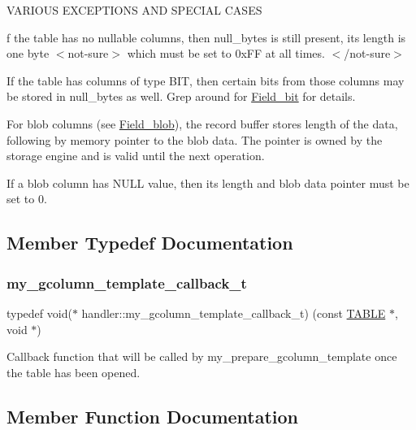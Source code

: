 V\+A\+R\+I\+O\+US E\+X\+C\+E\+P\+T\+I\+O\+NS A\+ND S\+P\+E\+C\+I\+AL C\+A\+S\+ES

f the table has no nullable columns, then null\+\_\+bytes is still present, its length is one byte $<$not-\/sure$>$ which must be set to 0x\+FF at all times. $<$/not-\/sure$>$

If the table has columns of type B\+IT, then certain bits from those columns may be stored in null\+\_\+bytes as well. Grep around for \mbox{\hyperlink{classField__bit}{Field\+\_\+bit}} for details.

For blob columns (see \mbox{\hyperlink{classField__blob}{Field\+\_\+blob}}), the record buffer stores length of the data, following by memory pointer to the blob data. The pointer is owned by the storage engine and is valid until the next operation.

If a blob column has N\+U\+LL value, then its length and blob data pointer must be set to 0. 

\subsection{Member Typedef Documentation}
\mbox{\label{classhandler_ad4c241e50948859d98ceae6e39066838}} 
\subsubsection{\texorpdfstring{my\+\_\+gcolumn\+\_\+template\+\_\+callback\+\_\+t}{my\_gcolumn\_template\_callback\_t}}
{\footnotesize\ttfamily typedef void($\ast$ handler\+::my\+\_\+gcolumn\+\_\+template\+\_\+callback\+\_\+t) (const \mbox{\hyperlink{structTABLE}{T\+A\+B\+LE}} $\ast$, void $\ast$)}

Callback function that will be called by my\+\_\+prepare\+\_\+gcolumn\+\_\+template once the table has been opened. 

\subsection{Member Function Documentation}
\mbox{\label{classhandler_a748d5e5b6dbbb0681cbac2ad881505c9}} 
